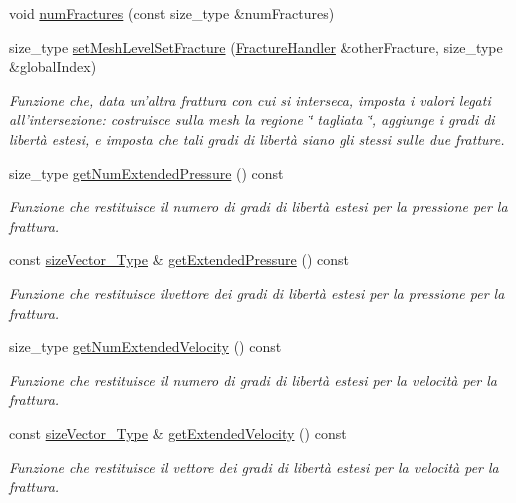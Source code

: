 \begin{DoxyCompactItemize}
\item 
void \hyperlink{classFractureHandler_a002e255a1976918ffbe6ea63b0fdae1b}{num\-Fractures} (const size\-\_\-type \&num\-Fractures)
\item 
size\-\_\-type \hyperlink{classFractureHandler_ae4204c592df2afe9c3dc6171f8bbb042}{set\-Mesh\-Level\-Set\-Fracture} (\hyperlink{classFractureHandler}{Fracture\-Handler} \&other\-Fracture, size\-\_\-type \&global\-Index)
\begin{DoxyCompactList}\small\item\em Funzione che, data un'altra frattura con cui si interseca, imposta i valori legati all'intersezione\-: costruisce sulla mesh la regione \char`\"{} tagliata \char`\"{}, aggiunge i gradi di libertà estesi, e imposta che tali gradi di libertà siano gli stessi sulle due fratture. \end{DoxyCompactList}\item 
size\-\_\-type \hyperlink{classFractureHandler_a585b1c169be23022e25e07bd9666d18d}{get\-Num\-Extended\-Pressure} () const 
\begin{DoxyCompactList}\small\item\em Funzione che restituisce il numero di gradi di libertà estesi per la pressione per la frattura. \end{DoxyCompactList}\item 
const \hyperlink{Core_8h_a83c51913d041a5001e8683434c09857f}{size\-Vector\-\_\-\-Type} \& \hyperlink{classFractureHandler_a5d8a3c910ba9a5d156decb747040e41f}{get\-Extended\-Pressure} () const 
\begin{DoxyCompactList}\small\item\em Funzione che restituisce ilvettore dei gradi di libertà estesi per la pressione per la frattura. \end{DoxyCompactList}\item 
size\-\_\-type \hyperlink{classFractureHandler_af5b7cdadefe6993813e76fd6238b1771}{get\-Num\-Extended\-Velocity} () const 
\begin{DoxyCompactList}\small\item\em Funzione che restituisce il numero di gradi di libertà estesi per la velocità per la frattura. \end{DoxyCompactList}\item 
const \hyperlink{Core_8h_a83c51913d041a5001e8683434c09857f}{size\-Vector\-\_\-\-Type} \& \hyperlink{classFractureHandler_acfb03361fe0e1060fdf07dd997065519}{get\-Extended\-Velocity} () const 
\begin{DoxyCompactList}\small\item\em Funzione che restituisce il vettore dei gradi di libertà estesi per la velocità per la frattura. \end{DoxyCompactList}\item 

\end{DoxyCompactItemize}
